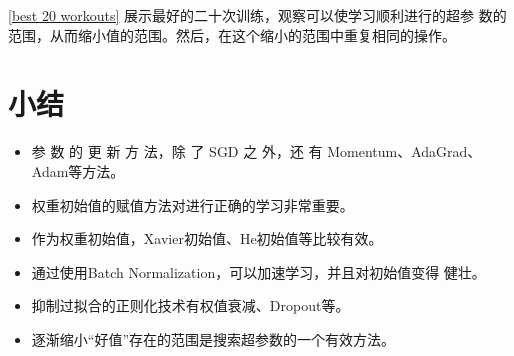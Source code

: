 \autoref{best 20 workouts} 展示最好的二十次训练，观察可以使学习顺利进行的超参
数的范围，从而缩小值的范围。然后，在这个缩小的范围中重复相同的操作。

\section{小结}
\begin{itemize}
    \item 参 数 的 更 新 方 法，除 了 SGD 之 外，还 有 Momentum、AdaGrad、
          Adam等方法。
    \item 权重初始值的赋值方法对进行正确的学习非常重要。
    \item 作为权重初始值，Xavier初始值、He初始值等比较有效。
    \item 通过使用Batch Normalization，可以加速学习，并且对初始值变得
          健壮。
    \item 抑制过拟合的正则化技术有权值衰减、Dropout等。
    \item 逐渐缩小“好值”存在的范围是搜索超参数的一个有效方法。
\end{itemize}
